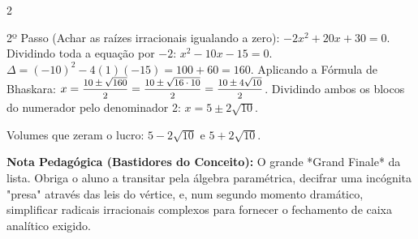 \begin{multicols*}{2}
\begin{tcolorbox}[colback=CorTitUm!5, colframe=CorTitUm, boxrule=1pt, arc=4pt, left=6pt, right=6pt, top=6pt, bottom=6pt]
    2º Passo (Achar as raízes irracionais igualando a zero):
    $-2x^2 + 20x + 30 = 0$. Dividindo toda a equação por $-2$:
    $x^2 - 10x - 15 = 0$.
    $\Delta = (-10)^2 - 4(1)(-15) = 100 + 60 = 160$.
    Aplicando a Fórmula de Bhaskara:
    $x = \mfrac{10 \pm \sqrt{160}}{2} = \mfrac{10 \pm \sqrt{16 \cdot 10}}{2} = \mfrac{10 \pm 4\sqrt{10}}{2}$.
    Dividindo ambos os blocos do numerador pelo denominador 2:
    $x = 5 \pm 2\sqrt{10}$.
    
    Volumes que zeram o lucro: $5 - 2\sqrt{10}$ e $5 + 2\sqrt{10}$.
    \end{tcolorbox}
    \vspace{0.15cm}
    
    \begin{boxexplicacao}
    \textbf{Nota Pedagógica (Bastidores do Conceito):} O grande *Grand Finale* da lista. Obriga o aluno a transitar pela álgebra paramétrica, decifrar uma incógnita "presa" através das leis do vértice, e, num segundo momento dramático, simplificar radicais irracionais complexos para fornecer o fechamento de caixa analítico exigido.
    \end{boxexplicacao}
\fi

\par\vspace{\espacoQuestao}

\end{multicols*}
